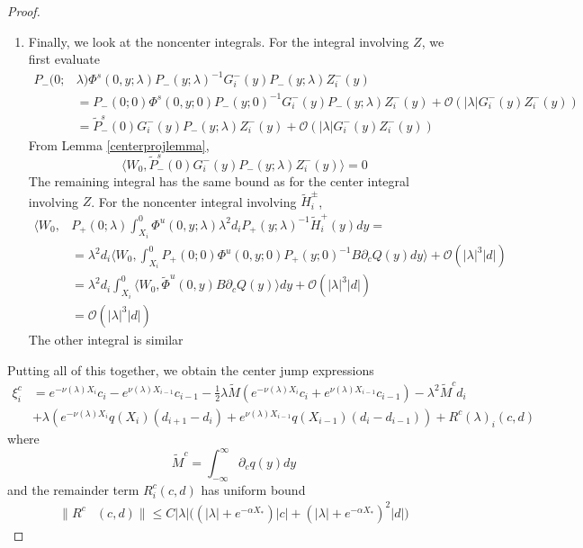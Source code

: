 \documentclass[thesis.tex]{subfiles}
\begin{document}
\begin{lemma}
\begin{proof}
\begin{enumerate}
\item Finally, we look at the noncenter integrals. For the integral involving $Z$, we first evaluate 
\begin{align*}
P_-(0; &\lambda) \Phi^s(0, y; \lambda) P_-(y; \lambda)^{-1} G_i^-(y) P_-(y; \lambda)Z_i^-(y) \\
&= P_-(0; 0) \Phi^s(0, y; 0) P_-(y; 0)^{-1}G_i^-(y) P_-(y; \lambda)Z_i^-(y) + \mathcal{O}(|\lambda| G_i^-(y) Z_i^-(y)) \\
&= \tilde{P}_-^s(0)G_i^-(y) P_-(y; \lambda)Z_i^-(y) + \mathcal{O}(|\lambda| G_i^-(y) Z_i^-(y))
\end{align*}
From Lemma \ref{centerprojlemma},
\[
\langle W_0, \tilde{P}_-^s(0)G_i^-(y) P_-(y; \lambda)Z_i^-(y) \rangle = 0
\]
The remaining integral has the same bound as for the center integral involving $Z$. For the noncenter integral involving $\tilde{H}_i^\pm$, 
\begin{align*}
\langle W_0, 
&P_+(0; \lambda) \int_{X_i}^0 \Phi^u(0, y; \lambda) \lambda^2 d_i P_+(y; \lambda)^{-1} \tilde{H}_i^+(y) dy 
= \\
&= \lambda^2 d_i \langle W_0, \int_{X_i}^0 P_+(0; 0) \Phi^u(0, y; 0) P_+(y; 0)^{-1} B \partial_c Q(y) dy \rangle + \mathcal{O}(|\lambda|^3 |d| ) \\
&= \lambda^2 d_i \int_{X_i}^0 \langle W_0, \tilde{\Phi}^u(0, y)  B \partial_c Q(y) \rangle dy + \mathcal{O}(|\lambda|^3 |d| ) \\
&= \mathcal{O}(|\lambda|^3 |d| ) 
\end{align*}
The other integral is similar
\end{enumerate}

Putting all of this together, we obtain the center jump expressions
\begin{align*}
\xi^c_i &= e^{-\nu(\lambda) X_i} c_i - e^{\nu(\lambda) X_{i-1}} c_{i-1} - \frac{1}{2} \lambda \tilde{M}( e^{-\nu(\lambda) X_i} c_i + e^{\nu(\lambda) X_{i-1}} c_{i-1} )
- \lambda^2 \tilde{M}^c d_i\\
&+ \lambda \left( e^{-\nu(\lambda)X_i} q(X_i) (d_{i+1} - d_i ) + e^{\nu(\lambda)X_{i-1}} q(X_{i-1}) (d_i - d_{i-1} )\right) + R^c(\lambda)_i(c, d)
\end{align*}
where
\[
\tilde{M}^c = \int_{-\infty}^\infty \partial_c q(y) dy
\]
and the remainder term $R^c_i(c, d)$ has uniform bound
\begin{equation}\label{centerR}
\begin{aligned}
\|R^c&(c, d)\| \leq C |\lambda| \Big( (|\lambda| + e^{-\alpha X_*})|c| + (|\lambda| + e^{-\alpha X_*})^2 |d| \Big)
\end{aligned}
\end{equation}


\end{proof}
\end{lemma}
\end{document}
